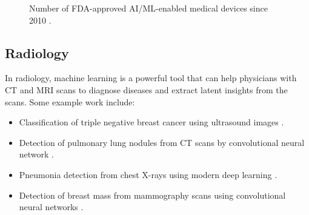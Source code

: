 \documentclass[a4paper]{article}
\begin{document}
\begin{figure}[htbp]
    \caption{Number of FDA-approved AI/ML-enabled medical devices since 2010 \cite{FDA_artificial_nodate}.} 
    \label{fig:FDA}
\end{figure}

\subsection{Radiology}
In radiology, machine learning is a powerful tool that can help physicians with CT and MRI scans to diagnose diseases and extract latent insights from the scans. Some example work include:
\begin{itemize}
    \item Classification of triple negative breast cancer using ultrasound images \cite{wu_machine_2019}.
    \item Detection of pulmonary lung nodules from CT scans by convolutional neural network \cite{van_ginneken_off--shelf_2015}.
    \item Pneumonia detection from chest X-rays using modern deep learning \cite{rajpurkar_chexnet_2017}.
    \item Detection of breast mass from mammography scans using convolutional neural networks \cite{arevalo_convolutional_2015}.
\end{itemize} 
\end{document}
